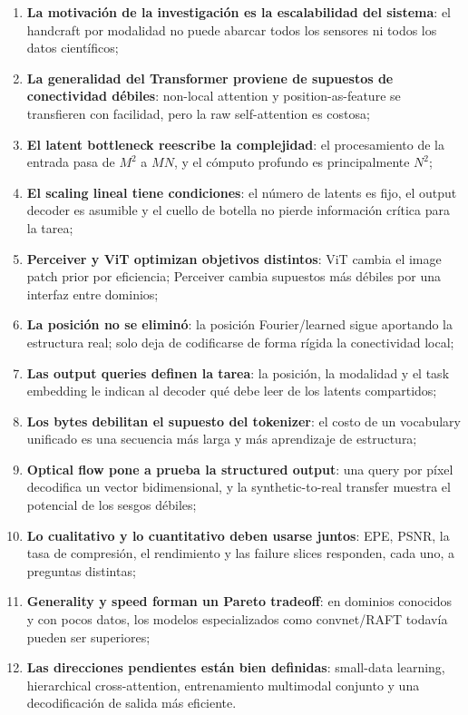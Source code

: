 \documentclass[a4paper]{article}
\begin{document}
\begin{enumerate}
  \item \textbf{La motivación de la investigación es la escalabilidad del sistema}: el handcraft por modalidad no puede abarcar todos los sensores ni todos los datos científicos;
  \item \textbf{La generalidad del Transformer proviene de supuestos de conectividad débiles}: non-local attention y position-as-feature se transfieren con facilidad, pero la raw self-attention es costosa;
  \item \textbf{El latent bottleneck reescribe la complejidad}: el procesamiento de la entrada pasa de $M^2$ a $MN$, y el cómputo profundo es principalmente $N^2$;
  \item \textbf{El scaling lineal tiene condiciones}: el número de latents es fijo, el output decoder es asumible y el cuello de botella no pierde información crítica para la tarea;
  \item \textbf{Perceiver y ViT optimizan objetivos distintos}: ViT cambia el image patch prior por eficiencia; Perceiver cambia supuestos más débiles por una interfaz entre dominios;
  \item \textbf{La posición no se eliminó}: la posición Fourier/learned sigue aportando la estructura real; solo deja de codificarse de forma rígida la conectividad local;
  \item \textbf{Las output queries definen la tarea}: la posición, la modalidad y el task embedding le indican al decoder qué debe leer de los latents compartidos;
  \item \textbf{Los bytes debilitan el supuesto del tokenizer}: el costo de un vocabulary unificado es una secuencia más larga y más aprendizaje de estructura;
  \item \textbf{Optical flow pone a prueba la structured output}: una query por píxel decodifica un vector bidimensional, y la synthetic-to-real transfer muestra el potencial de los sesgos débiles;
  \item \textbf{Lo cualitativo y lo cuantitativo deben usarse juntos}: EPE, PSNR, la tasa de compresión, el rendimiento y las failure slices responden, cada uno, a preguntas distintas;
  \item \textbf{Generality y speed forman un Pareto tradeoff}: en dominios conocidos y con pocos datos, los modelos especializados como convnet/RAFT todavía pueden ser superiores;
  \item \textbf{Las direcciones pendientes están bien definidas}: small-data learning, hierarchical cross-attention, entrenamiento multimodal conjunto y una decodificación de salida más eficiente.
\end{enumerate}
\end{document}

